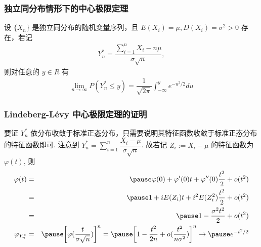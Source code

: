 \documentclass[Prob-All.tex]{subfiles}
\begin{document}
\begin{frame}
	\frametitle{独立同分布情形下的中心极限定理}
	\begin{thm} 设 $\{X_n\}$ 是独立同分布的随机变量序列，且 $E (X_i)=\mu, D (X_i)=\sigma^2>0$ 存在，若记
		\begin{eqnarray*}
			Y_n^*=\dfrac{\sum_{i=1}^nX_i-n\mu}{\sigma\sqrt{n}},
		\end{eqnarray*}
		则对任意的 $y\in R$ 有
		\begin{eqnarray*}
			\lim_{n\rightarrow\infty}P(Y_n^*\le y)=\dfrac{1}{\sqrt{2\pi}}\int_{-\infty}^ye^{-u^2/2}du
		\end{eqnarray*}

	\end{thm}
\end{frame}
\begin{frame}
	\frametitle{Lindeberg-L{\'e}vy 中心极限定理的证明}
	\zheng 要证 $Y_n^*$ 依分布收敛于标准正态分布，只需要说明其特征函数收敛于标准正态分布的特征函数即可. \pause 注意到 $Y_n^*=\sum_{i=1}^n\dfrac{X_i-\mu}{\sigma\sqrt{n}}$. 故若记 $Z_i:=X_i-\mu$ 的特征函数为 $\varphi (t)$, 则
	\begin{eqnarray*}
		\varphi(t)&=&\pause \varphi(0)+\varphi'(0)t+\varphi''(0)\frac{t^2}{2}+o(t^2)\\
		&=&\pause 1+iE(Z_i)t+i^2E(Z_i^2)\frac{t^2}{2}+o(t^2)\\
		&=&\pause 1-\frac{\sigma^2t^2}{2}+o(t^2)\\
		\varphi_{Y_n^*}&=&\pause \bigg[\varphi(\frac{t}{\sigma\sqrt{n}})\bigg]^n=\pause \bigg[1-\frac{t^2}{2n}+o(\frac{t^2}{n\sigma^2})\bigg]^n\rightarrow \pause e^{-t^2/2}
	\end{eqnarray*}

\end{frame}
\end{document}
